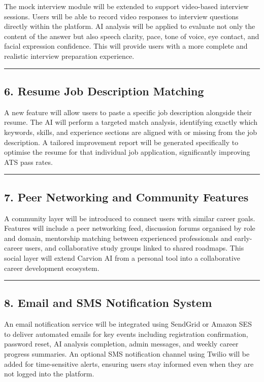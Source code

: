 \documentclass[12pt]{article}
\begin{document}
The mock interview module will be extended to support video-based interview sessions. Users will be able to record video responses to interview questions directly within the platform. AI analysis will be applied to evaluate not only the content of the answer but also speech clarity, pace, tone of voice, eye contact, and facial expression confidence. This will provide users with a more complete and realistic interview preparation experience.

\noindent\rule{\textwidth}{0.4pt}

\subsection{6. Resume Job Description Matching}

A new feature will allow users to paste a specific job description alongside their resume. The AI will perform a targeted match analysis, identifying exactly which keywords, skills, and experience sections are aligned with or missing from the job description. A tailored improvement report will be generated specifically to optimise the resume for that individual job application, significantly improving ATS pass rates.

\noindent\rule{\textwidth}{0.4pt}

\subsection{7. Peer Networking and Community Features}

A community layer will be introduced to connect users with similar career goals. Features will include a peer networking feed, discussion forums organised by role and domain, mentorship matching between experienced professionals and early-career users, and collaborative study groups linked to shared roadmaps. This social layer will extend Carvion AI from a personal tool into a collaborative career development ecosystem.

\noindent\rule{\textwidth}{0.4pt}

\subsection{8. Email and SMS Notification System}

An email notification service will be integrated using SendGrid or Amazon SES to deliver automated emails for key events including registration confirmation, password reset, AI analysis completion, admin messages, and weekly career progress summaries. An optional SMS notification channel using Twilio will be added for time-sensitive alerts, ensuring users stay informed even when they are not logged into the platform.
\end{document}
